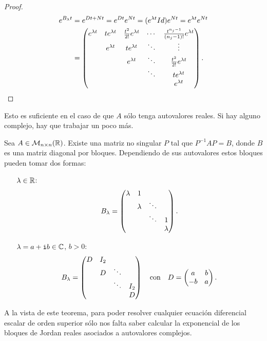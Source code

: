 \documentclass[../ecuaciones_diferenciales.tex]{subfiles}
\begin{document}
\begin{proof}
	\begin{align*}
		e^{B_\lambda t} &= e^{Dt + Nt} = e^{Dt} e^{Nt} 
			= (e^{\lambda t} Id) e^{Nt} = e^{\lambda t}e^{Nt} \\
			&= \begin{pmatrix}e^{\lambda t} & te^{\lambda t} & \frac{t^2}{2!}e^{\lambda t} & \cdots & \frac{t^{n_j-1}}{(n_j-1)!}e^{\lambda t} \\
				& e^{\lambda t} & te^{\lambda t}              & \ddots & \vdots                    \\
				&   & e^{\lambda t}              & \ddots & \frac{t^2}{2!}e^{\lambda t}            \\
				&   &                & \ddots & te^{\lambda t}                         \\
				&   &                &        & e^{\lambda t} \end{pmatrix}.
	\end{align*}
\end{proof}

Esto es suficiente en el caso de que \(A\) sólo tenga autovalores reales. Si
hay alguno complejo, hay que trabajar un poco más.

\begin{theorem}
	Sea \(A \in \mathcal{M}_{n \times n}(\mathbb{R})\). Existe una matriz no singular
	\(P\) tal que \(P^{-1}AP = B\), donde \(B\) es una matriz diagonal por
	bloques. Dependiendo de sus autovalores estos bloques pueden tomar dos
	formas:
	\begin{enumerate}[align=left]
		\item[\(\lambda \in \mathbb{R}\):] 
			\[B_\lambda = \begin{pmatrix}\lambda & 1 & & \\ & \lambda & \ddots & \\ & & \ddots & 1 \\ & & & \lambda\end{pmatrix}.\]

		\item[\(\lambda = a + \mathtt{i} b \in \mathbb{C}\), \(b > 0\):]
			\[B_\lambda = 
				\begin{pmatrix}D & I_2 & & \\ & D & \ddots & \\ & & \ddots &
				I_2 \\ & & & D\end{pmatrix}
				\quad \text{con} \quad D = \begin{pmatrix}a & b \\ -b & a\end{pmatrix}.\]
	\end{enumerate}
\end{theorem}

A la vista de este teorema, para poder resolver cualquier ecuación diferencial
escalar de orden superior sólo nos falta saber calcular la exponencial de los
bloques de Jordan reales asociados a autovalores complejos.
\end{document}
